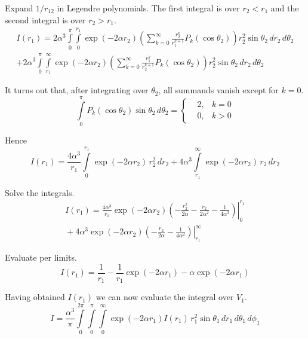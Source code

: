 \documentclass[12pt]{article}
\begin{document}
Expand $1/r_{12}$ in Legendre polynomials.
The first integral is over $r_2<r_1$ and the second integral is over $r_2>r_1$.
\begin{multline*}
I(r_1)=
2\alpha^3\int\limits_0^\pi\int\limits_0^{r_1}
\exp(-2\alpha r_2)
\left(\sum_{k=0}^\infty\frac{r_2^k}{r_1^{k+1}}P_k(\cos\theta_2)\right)
r_2^2\sin\theta_2\,dr_2\,d\theta_2
\\
+2\alpha^3\int\limits_0^\pi\int\limits_{r_1}^\infty
\exp(-2\alpha r_2)
\left(\sum_{k=0}^\infty\frac{r_1^k}{r_2^{k+1}}P_k(\cos\theta_2)\right)
r_2^2\sin\theta_2\,dr_2\,d\theta_2
\end{multline*}

It turns out that, after integrating over $\theta_2$, all summands vanish except for $k=0$.
\begin{equation*}
\int\limits_0^\pi P_k(\cos\theta_2)\sin\theta_2\,d\theta_2=
\left\{
\begin{aligned}
&2, & k=0
\\
&0, & k>0
\end{aligned}\right.
\tag{5}
\end{equation*}

Hence
\begin{equation*}
I(r_1)=
\frac{4\alpha^3}{r_1}\int\limits_0^{r_1}\exp(-2\alpha r_2)\,r_2^2\,dr_2
+4\alpha^3\int\limits_{r_1}^\infty\exp(-2\alpha r_2)\,r_2\,dr_2
\end{equation*}

Solve the integrals.
\begin{multline*}
I(r_1)=
\frac{4\alpha^3}{r_1}
\left.
\exp(-2\alpha r_2)\left(-\frac{r_2^2}{2\alpha}-\frac{r_2}{2\alpha^2}-\frac{1}{4\alpha^3}
\right)\right|_0^{r_1}
\\
{}+4\alpha^3\left.\exp(-2\alpha r_2)\left(-\frac{r_2}{2\alpha}-\frac{1}{4\alpha^2}\right)\right|_{r_1}^\infty
\end{multline*}

Evaluate per limits.
\begin{equation*}
I(r_1)=\frac{1}{r_1}-\frac{1}{r_1}\exp(-2\alpha r_1)-\alpha\exp(-2\alpha r_1)
\tag{6}
\end{equation*}

Having obtained $I(r_1)$ we can now evaluate the integral over $V_1$.
\begin{equation*}
I=\frac{\alpha^3}{\pi}\int\limits_0^{2\pi}\int\limits_0^\pi\int\limits_0^\infty
\exp(-2\alpha r_1)I(r_1)\,r_1^2\sin\theta_1\,dr_1\,d\theta_1\,d\phi_1
\end{equation*}
\end{document}
